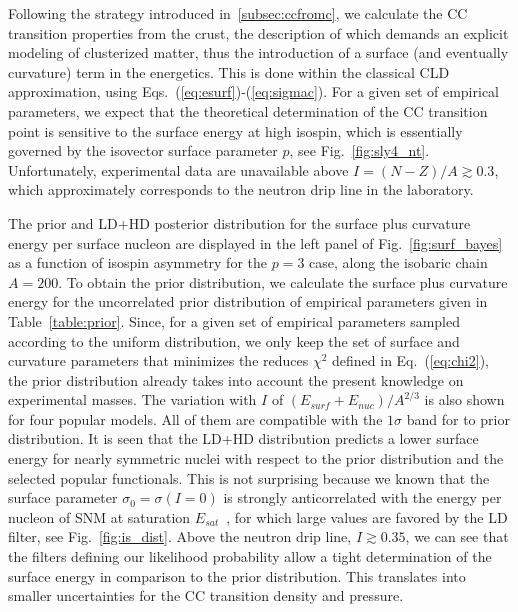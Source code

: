 Following the strategy introduced in~\ref{subsec:ccfromc}, we calculate the CC 
transition properties from the crust, the description of which demands an
explicit modeling of clusterized matter, thus the introduction of a surface
(and eventually curvature) term in the energetics. This is done 
within the classical CLD approximation, using
Eqs.~(\ref{eq:esurf})-(\ref{eq:sigmac}). For a given set of empirical
parameters, we expect that the theoretical determination of the CC transition 
point is sensitive to the surface energy at high isospin, which is essentially 
governed by the isovector surface parameter $p$, see Fig.~\ref{fig:sly4_nt}.
Unfortunately, experimental data are unavailable above $I = (N-Z)/A \gtrsim 
0.3$, which approximately corresponds to the neutron drip line in the
laboratory.

The prior and LD+HD posterior distribution for the
surface plus curvature energy per surface nucleon are displayed in the left 
panel of Fig.~\ref{fig:surf_bayes} as a function of isospin asymmetry for the 
$p=3$ case, along the isobaric chain $A=200$. 
%
{To obtain the prior distribution, we calculate the surface plus 
  curvature energy for the uncorrelated prior distribution of 
  empirical parameters given in Table~\ref{table:prior}. Since, for a given set
  of empirical parameters sampled according to the uniform distribution, we 
  only keep the set of surface and curvature parameters that minimizes the 
  reduces $\chi^2$ defined in Eq.~(\ref{eq:chi2}), the prior distribution 
  already takes into account the present knowledge on experimental masses.} 
%
The variation with $I$ of $(E_{surf} + E_{nuc})/A^{2/3}$ is also shown for 
four popular models. All of them are compatible with the $1\sigma$ band 
for to prior distribution.
It is seen that the LD+HD distribution predicts a lower surface energy for 
nearly symmetric nuclei with respect to the prior distribution and the 
selected popular functionals. This is not surprising because we known that the 
surface parameter $\sigma_0=\sigma(I=0)$ is strongly anticorrelated with the 
energy per nucleon of SNM at saturation $E_{sat}$~\cite{Carreau2019cc}, for 
which large values are favored by the LD filter, see Fig.~\ref{fig:is_dist}.
Above the neutron drip line, $I \gtrsim 0.35$, we can see that the filters 
defining our likelihood probability allow a tight determination of the 
surface energy in comparison to the prior distribution. This translates into
smaller uncertainties for the CC transition density and pressure.

